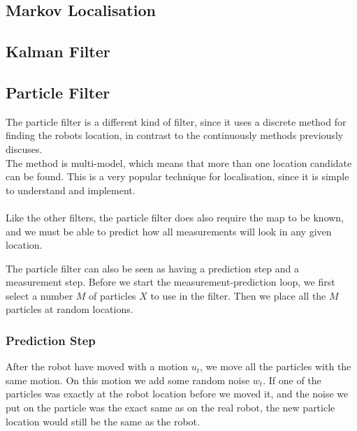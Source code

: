\subsection{Markov Localisation}


\subsection{Kalman Filter}



\subsection{Particle Filter}
The particle filter is a different kind of filter, since it uses a discrete method for finding the robots location, in contrast to the continuously methods previously discuses. \\
The method is multi-model, which means that more than one location candidate can be found. This is a very popular technique for localisation, since it is simple to understand and implement. 
\\
\\
Like the other filters, the particle filter does also require the map to be known, and we must be able to predict how all measurements will look in any given location. 

The particle filter can also be seen as having a prediction step and a measurement step. Before we start the measurement-prediction loop, we first select a number $M$ of particles $X$ to use in the filter. Then we place all the $M$ particles at random locations. 

\subsubsection{Prediction Step}
After the robot have moved with a motion $u_t$, we move all the particles with the same motion. On this motion we add some random noise $w_t$. If one of the particles was exactly at the robot location before we moved it, and the noise we put on the particle was the exact same as on the real robot, the new particle location would still be the same as the robot.  

